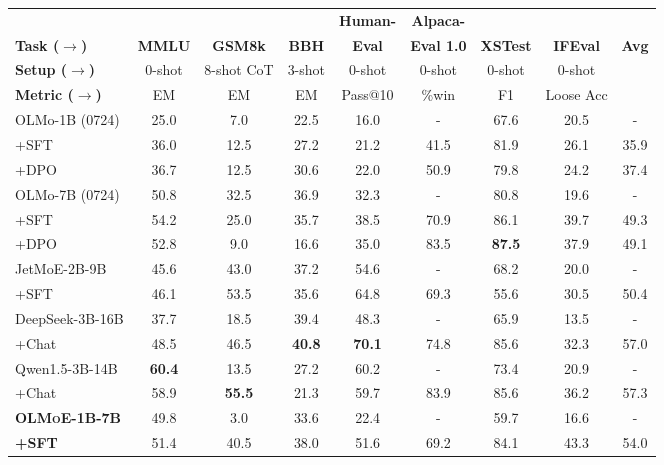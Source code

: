 \documentclass{article}
\newcommand{\modelsmall}{\textbf{\textsc{OLMoE-1B-7B}}}
\begin{document}
\begin{table}[htbp]
{\footnotesize
\begin{tabular}{l|ccccccc|c}
\toprule
&  &  &  & \textbf{Human-} & \textbf{Alpaca-} & & \\
\textbf{Task ($\rightarrow$)} & \textbf{MMLU} & \textbf{GSM8k} & \textbf{BBH} & \textbf{Eval} & \textbf{Eval 1.0} & \textbf{XSTest} & \textbf{IFEval} & \textbf{Avg} \\
\textbf{Setup ($\rightarrow$)} & \scriptsize{0-shot} & \scriptsize{8-shot CoT} & \scriptsize{3-shot} & \scriptsize{0-shot} & \scriptsize{0-shot} &\scriptsize{0-shot} & \scriptsize{0-shot} & \scriptsize{} \\
\textbf{Metric ($\rightarrow$)} & \scriptsize{EM} & \scriptsize{EM} & \scriptsize{EM} & \scriptsize{Pass@10} & \scriptsize{\%win} & \scriptsize{F1} & \scriptsize{Loose Acc} \\
\midrule
OLMo-1B (0724) & 25.0 & 7.0 & 22.5 & 16.0 & - & 67.6 & 20.5 & - \\
+SFT & 36.0 & 12.5 & 27.2 & 21.2 & 41.5 & 81.9 & 26.1 & 35.9 \\
+DPO & 36.7 & 12.5 & 30.6 & 22.0 & 50.9 & 79.8 & 24.2 & 37.4\\
\midrule
OLMo-7B (0724) & 50.8 & 32.5 & 36.9 & 32.3 & - & 80.8 & 19.6 & - \\
+SFT & 54.2 & 25.0 & 35.7 & 38.5 & 70.9 & 86.1 & 39.7 & 49.3 \\
+DPO & 52.8 & 9.0 & 16.6 & 35.0 & 83.5 & \textbf{87.5} & 37.9 & 49.1 \\
\midrule
JetMoE-2B-9B & 45.6 & 43.0 & 37.2 & 54.6 & - & 68.2 & 20.0 & - \\
+SFT & 46.1 & 53.5 & 35.6 & 64.8 & 69.3 & 55.6 & 30.5 & 50.4 \\
\midrule
DeepSeek-3B-16B & 37.7 & 18.5 & 39.4 & 48.3 & - & 65.9 & 13.5 & - \\
+Chat & 48.5 & 46.5 & \textbf{40.8} & \textbf{70.1} & 74.8 & 85.6 & 32.3 & 57.0 \\
\midrule
Qwen1.5-3B-14B & \textbf{60.4} & 13.5 & 27.2 & 60.2 & - & 73.4 & 20.9 & - \\
+Chat & 58.9 & \textbf{55.5} & 21.3 & 59.7 & 83.9 & 85.6 & 36.2 & 57.3 \\
\midrule
{\modelsmall{}} & 49.8 & 3.0 & 33.6 & 22.4 & - & 59.7 & 16.6 & - \\
\textbf{+SFT} & 51.4 & 40.5 & 38.0 & 51.6 & 69.2 & 84.1 & 43.3 & 54.0 \\

\end{tabular}}
\end{table}
\end{document}
